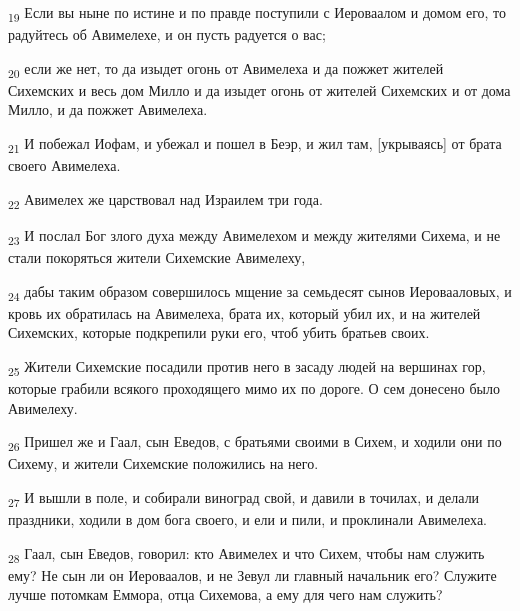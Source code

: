 \begin{tcolorbox}
\textsubscript{19} Если вы ныне по истине и по правде поступили с Иероваалом и домом его, то радуйтесь об Авимелехе, и он пусть радуется о вас;
\end{tcolorbox}
\begin{tcolorbox}
\textsubscript{20} если же нет, то да изыдет огонь от Авимелеха и да пожжет жителей Сихемских и весь дом Милло и да изыдет огонь от жителей Сихемских и от дома Милло, и да пожжет Авимелеха.
\end{tcolorbox}
\begin{tcolorbox}
\textsubscript{21} И побежал Иофам, и убежал и пошел в Беэр, и жил там, [укрываясь] от брата своего Авимелеха.
\end{tcolorbox}
\begin{tcolorbox}
\textsubscript{22} Авимелех же царствовал над Израилем три года.
\end{tcolorbox}
\begin{tcolorbox}
\textsubscript{23} И послал Бог злого духа между Авимелехом и между жителями Сихема, и не стали покоряться жители Сихемские Авимелеху,
\end{tcolorbox}
\begin{tcolorbox}
\textsubscript{24} дабы таким образом совершилось мщение за семьдесят сынов Иеровааловых, и кровь их обратилась на Авимелеха, брата их, который убил их, и на жителей Сихемских, которые подкрепили руки его, чтоб убить братьев своих.
\end{tcolorbox}
\begin{tcolorbox}
\textsubscript{25} Жители Сихемские посадили против него в засаду людей на вершинах гор, которые грабили всякого проходящего мимо их по дороге. О сем донесено было Авимелеху.
\end{tcolorbox}
\begin{tcolorbox}
\textsubscript{26} Пришел же и Гаал, сын Еведов, с братьями своими в Сихем, и ходили они по Сихему, и жители Сихемские положились на него.
\end{tcolorbox}
\begin{tcolorbox}
\textsubscript{27} И вышли в поле, и собирали виноград свой, и давили в точилах, и делали праздники, ходили в дом бога своего, и ели и пили, и проклинали Авимелеха.
\end{tcolorbox}
\begin{tcolorbox}
\textsubscript{28} Гаал, сын Еведов, говорил: кто Авимелех и что Сихем, чтобы нам служить ему? Не сын ли он Иероваалов, и не Зевул ли главный начальник его? Служите лучше потомкам Еммора, отца Сихемова, а ему для чего нам служить?
\end{tcolorbox}
